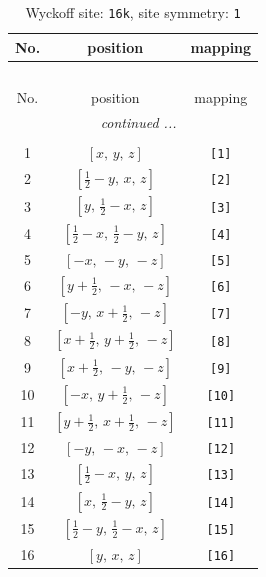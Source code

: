\documentclass[fleqn,8pt]{jsarticle}
\begin{document}
\begin{longtable}{ccc}
\caption{Wyckoff site: {\tt 16k}, site symmetry: {\tt 1}}
 \\
 \hline \hline
No. & position & mapping \\ \hline \endfirsthead

\multicolumn{2}{l}{\tablename\ \thetable{}} \\
 \hline \hline
No. & position & mapping \\ \hline \endhead

 \hline \hline
\multicolumn{2}{r}{\footnotesize\it continued ...} \\ \endfoot

 \hline \hline
\multicolumn{2}{r}{} \\ \endlastfoot

1 & $\left[ x,\, y,\, z \right]$ & {\tt [1]} \\ \hline
2 & $\left[ \frac{1}{2} - y,\, x,\, z \right]$ & {\tt [2]} \\ \hline
3 & $\left[ y,\, \frac{1}{2} - x,\, z \right]$ & {\tt [3]} \\ \hline
4 & $\left[ \frac{1}{2} - x,\, \frac{1}{2} - y,\, z \right]$ & {\tt [4]} \\ \hline
5 & $\left[ - x,\, - y,\, - z \right]$ & {\tt [5]} \\ \hline
6 & $\left[ y + \frac{1}{2},\, - x,\, - z \right]$ & {\tt [6]} \\ \hline
7 & $\left[ - y,\, x + \frac{1}{2},\, - z \right]$ & {\tt [7]} \\ \hline
8 & $\left[ x + \frac{1}{2},\, y + \frac{1}{2},\, - z \right]$ & {\tt [8]} \\ \hline
9 & $\left[ x + \frac{1}{2},\, - y,\, - z \right]$ & {\tt [9]} \\ \hline
10 & $\left[ - x,\, y + \frac{1}{2},\, - z \right]$ & {\tt [10]} \\ \hline
11 & $\left[ y + \frac{1}{2},\, x + \frac{1}{2},\, - z \right]$ & {\tt [11]} \\ \hline
12 & $\left[ - y,\, - x,\, - z \right]$ & {\tt [12]} \\ \hline
13 & $\left[ \frac{1}{2} - x,\, y,\, z \right]$ & {\tt [13]} \\ \hline
14 & $\left[ x,\, \frac{1}{2} - y,\, z \right]$ & {\tt [14]} \\ \hline
15 & $\left[ \frac{1}{2} - y,\, \frac{1}{2} - x,\, z \right]$ & {\tt [15]} \\ \hline
16 & $\left[ y,\, x,\, z \right]$ & {\tt [16]} \\
\end{longtable}
\end{document}
